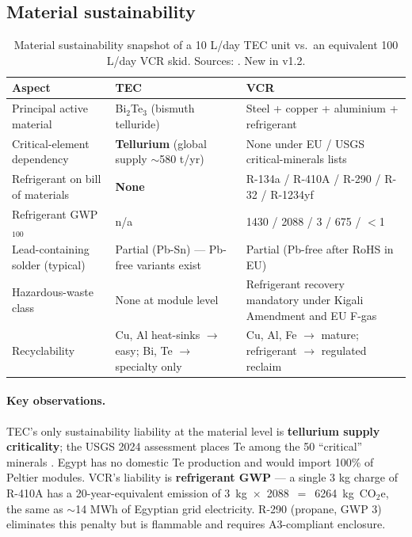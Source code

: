 \documentclass[11pt,a4paper]{article}
\begin{document}
\subsection{Material sustainability}
\begin{table}[h]
\centering\small
\caption{Material sustainability snapshot of a 10 L/day TEC unit vs.\ an equivalent 100 L/day VCR skid. Sources: \citep{usgs_tellurium_2024,iea_critical_minerals_2024,unep_kigali_2016}. New in v1.2.}
\label{tab:material_sus}
\begin{tabular}{@{}lll@{}}
\toprule
\textbf{Aspect} & \textbf{TEC} & \textbf{VCR}\\
\midrule
Principal active material & Bi$_2$Te$_3$ (bismuth telluride) & Steel + copper + aluminium + refrigerant\\
Critical-element dependency & \textbf{Tellurium} (global supply $\sim$580 t/yr) & None under EU / USGS critical-minerals lists\\
Refrigerant on bill of materials & \textbf{None} & R-134a / R-410A / R-290 / R-32 / R-1234yf\\
Refrigerant GWP$_{100}$ \citep{ipcc_ar5_ch8,wmo_ozone_2022} & n/a & 1430 / 2088 / 3 / 675 / $<$1\\
Lead-containing solder (typical) & Partial (Pb-Sn) --- Pb-free variants exist & Partial (Pb-free after RoHS in EU)\\
Hazardous-waste class & None at module level & Refrigerant recovery mandatory under Kigali Amendment and EU F-gas\\
Recyclability & Cu, Al heat-sinks $\to$ easy; Bi, Te $\to$ specialty only & Cu, Al, Fe $\to$ mature; refrigerant $\to$ regulated reclaim\\
\bottomrule
\end{tabular}
\end{table}

\paragraph{Key observations.}
TEC's only sustainability liability at the material level is \textbf{tellurium supply criticality}; the USGS 2024 assessment places Te among the 50 ``critical'' minerals \citep{usgs_tellurium_2024}. Egypt has no domestic Te production and would import 100\% of Peltier modules. VCR's liability is \textbf{refrigerant GWP} --- a single 3 kg charge of R-410A has a 20-year-equivalent emission of \mbox{3~kg~$\times$~2088~$=$~6264~kg~CO$_2$e}, the same as $\sim$14 MWh of Egyptian grid electricity. R-290 (propane, GWP 3) eliminates this penalty but is flammable and requires A3-compliant enclosure.
\end{document}

